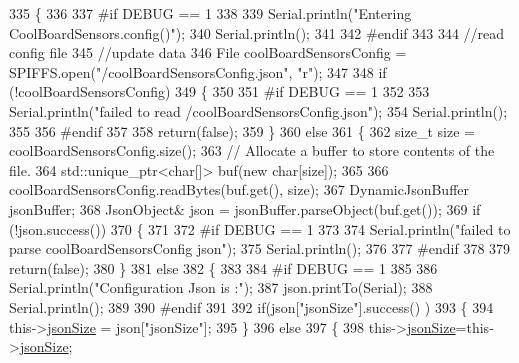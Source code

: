 \begin{DoxyCode}
335 \{
336 
337 \textcolor{preprocessor}{#if DEBUG == 1}
338 
339     Serial.println(\textcolor{stringliteral}{"Entering CoolBoardSensors.config()"});
340     Serial.println();
341 
342 \textcolor{preprocessor}{#endif}
343 
344     \textcolor{comment}{//read config file}
345     \textcolor{comment}{//update data}
346     File coolBoardSensorsConfig = SPIFFS.open(\textcolor{stringliteral}{"/coolBoardSensorsConfig.json"}, \textcolor{stringliteral}{"r"});
347 
348     \textcolor{keywordflow}{if} (!coolBoardSensorsConfig) 
349     \{
350     
351 \textcolor{preprocessor}{    #if DEBUG == 1}
352 
353         Serial.println(\textcolor{stringliteral}{"failed to read /coolBoardSensorsConfig.json"});
354         Serial.println();
355     
356 \textcolor{preprocessor}{    #endif}
357 
358         \textcolor{keywordflow}{return}(\textcolor{keyword}{false});
359     \}
360     \textcolor{keywordflow}{else}
361     \{
362         \textcolor{keywordtype}{size\_t} size = coolBoardSensorsConfig.size();
363         \textcolor{comment}{// Allocate a buffer to store contents of the file.}
364         std::unique\_ptr<char[]> buf(\textcolor{keyword}{new} \textcolor{keywordtype}{char}[size]);
365 
366         coolBoardSensorsConfig.readBytes(buf.get(), size);
367         DynamicJsonBuffer jsonBuffer;
368         JsonObject& json = jsonBuffer.parseObject(buf.get());
369         \textcolor{keywordflow}{if} (!json.success()) 
370         \{
371         
372 \textcolor{preprocessor}{        #if DEBUG == 1}
373 
374             Serial.println(\textcolor{stringliteral}{"failed to parse coolBoardSensorsConfig json"});
375             Serial.println();
376         
377 \textcolor{preprocessor}{        #endif}
378     
379             \textcolor{keywordflow}{return}(\textcolor{keyword}{false});
380         \} 
381         \textcolor{keywordflow}{else}
382         \{
383 
384 \textcolor{preprocessor}{        #if DEBUG == 1}
385 
386             Serial.println(\textcolor{stringliteral}{"Configuration Json is :"});
387             json.printTo(Serial);
388             Serial.println();
389         
390 \textcolor{preprocessor}{        #endif}
391       
392             \textcolor{keywordflow}{if}(json[\textcolor{stringliteral}{"jsonSize"}].success() )
393             \{
394                 this->\hyperlink{classCoolBoardSensors_a05a40dc80bfff14ffb830f549b876f8d}{jsonSize} = json[\textcolor{stringliteral}{"jsonSize"}]; 
395             \}
396             \textcolor{keywordflow}{else}
397             \{
398                 this->\hyperlink{classCoolBoardSensors_a05a40dc80bfff14ffb830f549b876f8d}{jsonSize}=this->\hyperlink{classCoolBoardSensors_a05a40dc80bfff14ffb830f549b876f8d}{jsonSize};          

\end{DoxyCode}

